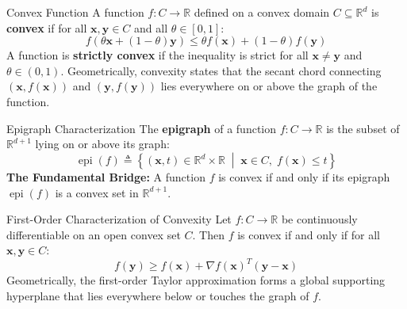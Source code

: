 \begin{definitionbox}{Convex Function}
A function $f: C \to \mathbb{R}$ defined on a convex domain $C \subseteq \mathbb{R}^d$ is \textbf{convex} if for all $\mathbf{x}, \mathbf{y} \in C$ and all $\theta \in [0, 1]$:
\begin{equation}
f(\theta \mathbf{x} + (1 - \theta)\mathbf{y}) \le \theta f(\mathbf{x}) + (1 - \theta) f(\mathbf{y})
\label{eq:convex_func_def}
\end{equation}
A function is \textbf{strictly convex} if the inequality is strict for all $\mathbf{x} \ne \mathbf{y}$ and $\theta \in (0, 1)$. Geometrically, convexity states that the secant chord connecting $( \mathbf{x}, f(\mathbf{x}) )$ and $( \mathbf{y}, f(\mathbf{y}) )$ lies everywhere on or above the graph of the function.
\end{definitionbox}

\begin{definitionbox}{Epigraph Characterization}
The \textbf{epigraph} of a function $f: C \to \mathbb{R}$ is the subset of $\mathbb{R}^{d+1}$ lying on or above its graph:
\begin{equation}
\operatorname{epi}(f) \triangleq \left\{ (\mathbf{x}, t) \in \mathbb{R}^d \times \mathbb{R} \;\middle|\; \mathbf{x} \in C, \; f(\mathbf{x}) \le t \right\}
\label{eq:epigraph_def}
\end{equation}
\textbf{The Fundamental Bridge:} A function $f$ is convex if and only if its epigraph $\operatorname{epi}(f)$ is a convex set in $\mathbb{R}^{d+1}$.
\end{definitionbox}

\begin{theorembox}{First-Order Characterization of Convexity}
Let $f: C \to \mathbb{R}$ be continuously differentiable on an open convex set $C$. Then $f$ is convex if and only if for all $\mathbf{x}, \mathbf{y} \in C$:
\begin{equation}
f(\mathbf{y}) \ge f(\mathbf{x}) + \nabla f(\mathbf{x})^T (\mathbf{y} - \mathbf{x})
\label{eq:first_order_convex}
\end{equation}
Geometrically, the first-order Taylor approximation forms a global supporting hyperplane that lies everywhere below or touches the graph of $f$.
\end{theorembox}

